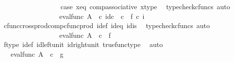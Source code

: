 \begin{isabellebody}
\ \ \ \ \ \ \ \ \ \ \ \ \ \ \ \ \isamarkupfalse%
\ case{}\ x{\isacharunderscore}{\kern0pt}eq\ comp{\isacharunderscore}{\kern0pt}associative{}\ x{\isacharunderscore}{\kern0pt}type\ \isamarkupfalse%
\ {\isacharparenleft}{\kern0pt}typecheck{\isacharunderscore}{\kern0pt}cfuncs{\isacharcomma}{\kern0pt}\ auto{\isacharparenright}{\kern0pt}\isanewline
\ \ \ \ \ \ \ \ \ \ \ \ \isamarkupfalse%
\ \isamarkupfalse%
\ {\isachardoublequoteopen}{\isachardot}{\kern0pt}{\isachardot}{\kern0pt}{\isachardot}{\kern0pt}\ {\isacharequal}{\kern0pt}\ eval{\isacharunderscore}{\kern0pt}func\ A\ {\isasymOmega}\ {\isasymcirc}\isactrlsub c\ {\isasymlangle}id\isactrlsub c\ {\isasymOmega}\ {\isasymcirc}\isactrlsub c\ \ {\isasymt}{\isacharcomma}{\kern0pt}f\ {\isasymcirc}\isactrlsub c\ i{\isasymrangle}{\isachardoublequoteclose}\isanewline
\ \ \ \ \ \ \ \ \ \ \ \ \ \ \ \ \isamarkupfalse%
\ cfunc{\isacharunderscore}{\kern0pt}cross{\isacharunderscore}{\kern0pt}prod{\isacharunderscore}{\kern0pt}comp{\isacharunderscore}{\kern0pt}cfunc{\isacharunderscore}{\kern0pt}prod\ i{\isacharunderscore}{\kern0pt}def\ id{}{\isacharunderscore}{\kern0pt}eq\ id{}{\isacharunderscore}{\kern0pt}is\ \isamarkupfalse%
\ {\isacharparenleft}{\kern0pt}typecheck{\isacharunderscore}{\kern0pt}cfuncs{\isacharcomma}{\kern0pt}\ auto{\isacharparenright}{\kern0pt}\isanewline
\ \ \ \ \ \ \ \ \ \ \ \ \isamarkupfalse%
\ \isamarkupfalse%
\ {\isachardoublequoteopen}{\isachardot}{\kern0pt}{\isachardot}{\kern0pt}{\isachardot}{\kern0pt}\ {\isacharequal}{\kern0pt}\ eval{\isacharunderscore}{\kern0pt}func\ A\ {\isasymOmega}\ {\isasymcirc}\isactrlsub c\ {\isasymlangle}{\isasymt}{\isacharcomma}{\kern0pt}\ f\ {\isasymrangle}{\isachardoublequoteclose}\isanewline
\ \ \ \ \ \ \ \ \ \ \ \ \ \ \isamarkupfalse%
\ f{\isacharunderscore}{\kern0pt}type\ i{\isacharunderscore}{\kern0pt}def\ id{\isacharunderscore}{\kern0pt}left{\isacharunderscore}{\kern0pt}unit{}\ id{\isacharunderscore}{\kern0pt}right{\isacharunderscore}{\kern0pt}unit{}\ true{\isacharunderscore}{\kern0pt}func{\isacharunderscore}{\kern0pt}type\ \isamarkupfalse%
\ auto\isanewline
\ \ \ \ \ \ \ \ \ \ \ \ \isamarkupfalse%
\ \isamarkupfalse%
\ {\isachardoublequoteopen}{\isachardot}{\kern0pt}{\isachardot}{\kern0pt}{\isachardot}{\kern0pt}\ {\isacharequal}{\kern0pt}\ eval{\isacharunderscore}{\kern0pt}func\ A\ {\isasymOmega}\ {\isasymcirc}\isactrlsub c\ {\isasymlangle}{\isasymt}{\isacharcomma}{\kern0pt}\ g{\isasymrangle}{\isachardoublequoteclose}\isanewline

\end{isabellebody}
